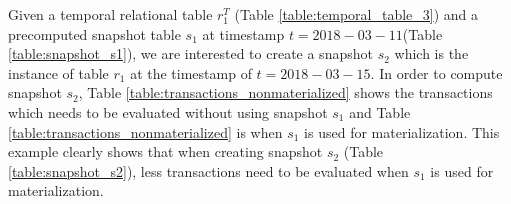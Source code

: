 			\begin{example}
				Given a temporal relational table $r_1^T$ (Table \ref{table:temporal_table_3}) and a precomputed snapshot table $s_1$ at timestamp $t = 2018-03-11$(Table \ref{table:snapshot_s1}), we are interested to create a snapshot $s_2$ which is the instance of table $r_1$ at the timestamp of $t = 2018-03-15$. In order to compute snapshot $s_2$, Table \ref{table:transactions_nonmaterialized} shows the transactions which needs to be evaluated without using snapshot $s_1$ and Table \ref{table:transactions_nonmaterialized} is when $s_1$ is used for materialization. This example clearly shows that when creating snapshot $s_2$ (Table \ref{table:snapshot_s2}), less transactions need to be evaluated when $s_1$ is used for materialization.
			\label{example:materialized_snapshot_complexity}
			\end{example}

